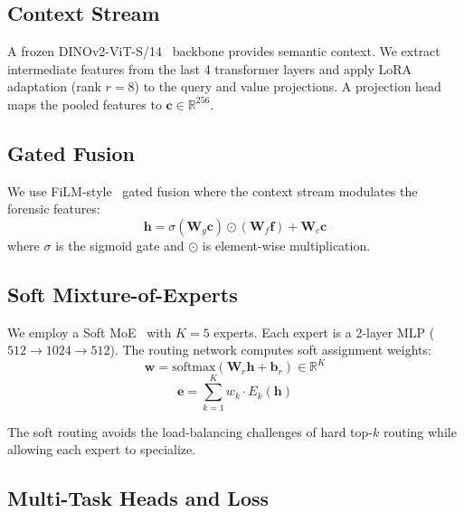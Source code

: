 \documentclass[conference]{IEEEtran}
\begin{document}
\subsection{Context Stream}
\label{sec:context}

A frozen DINOv2-ViT-S/14~\cite{oquab2024dinov2} backbone provides semantic context.
We extract intermediate features from the last 4 transformer layers and apply LoRA~\cite{hu2022lora} adaptation (rank $r = 8$) to the query and value projections.
A projection head maps the pooled features to $\mathbf{c} \in \mathbb{R}^{256}$.

\subsection{Gated Fusion}
\label{sec:fusion}

We use FiLM-style~\cite{perez2018film} gated fusion where the context stream modulates the forensic features:
\begin{equation}
  \mathbf{h} = \sigma(\mathbf{W}_g \mathbf{c}) \odot (\mathbf{W}_f \mathbf{f}) + \mathbf{W}_c \mathbf{c}
  \label{eq:fusion}
\end{equation}
where $\sigma$ is the sigmoid gate and $\odot$ is element-wise multiplication.

\subsection{Soft Mixture-of-Experts}
\label{sec:moe}

We employ a Soft MoE~\cite{puigcerver2024sparse} with $K = 5$ experts. Each expert is a 2-layer MLP ($512 \to 1024 \to 512$). The routing network computes soft assignment weights:
\begin{equation}
  \mathbf{w} = \text{softmax}(\mathbf{W}_r \mathbf{h} + \mathbf{b}_r) \in \mathbb{R}^K
\end{equation}
\begin{equation}
  \mathbf{e} = \sum_{k=1}^{K} w_k \cdot E_k(\mathbf{h})
  \label{eq:moe}
\end{equation}

The soft routing avoids the load-balancing challenges of hard top-$k$ routing while allowing each expert to specialize.

\subsection{Multi-Task Heads and Loss}
\label{sec:loss}
\end{document}
